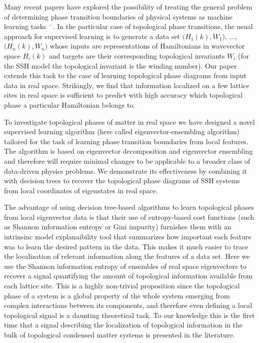 \documentclass[fleqn,10pt]{wlscirep}
\begin{document}
Many recent papers have explored the possibility of treating the general problem of determining phase transition boundaries of physical systems as machine learning tasks \cite{carrasquilla2017machine}$^-$\cite{rodriguez2018identifying}. In the particular case of topological phase transitions, the usual approach for supervised learning is to generate a data set $\big(H_1(k), W_1\big)$, ..., $\big(H_n(k), W_n\big)$ whose inputs are representations of Hamiltonians in wavevector space $H_i(k)$ and targets are their corresponding topological invariants $W_i$ (for the SSH model the topological invariant is the winding number). Our paper extends this task to the case of learning topological phase diagrams from input data in real space. Strikingly, we find that information localized on a few lattice sites in real space is sufficient to predict with high accuracy which topological phase a particular Hamiltonian belongs to.

To investigate topological phases of matter in real space we have designed a novel supervised learning algorithm (here called eigenvector-ensembling algorithm) tailored for the task of learning phase transition boundaries from local features. The algorithm is based on eigenvector decomposition and eigenvector ensembling and therefore will require minimal changes to be applicable to a broader class of data-driven physics problems. We demonstrate its effectiveness by combining it with decision trees to recover the topological phase diagrams of SSH systems from local coordinates of eigenstates in real space.

The advantage of using decision tree-based algorithms to learn topological phases from local eigenvector data is that their use of entropy-based cost functions (such as Shannon information entropy or Gini impurity) furnishes them with an intrinsinc model explanaibility tool that summarizes how important each feature was to learn the desired pattern in the data. This makes it much easier to trace the localization of relevant information along the features of a data set. Here we use the Shannon information entropy of ensembles of real space eigenvectors to recover a signal quantifying the amount of topological information available from each lattice site. This is a highly non-trivial proposition since the topological phase of a system is a global property of the whole system emerging from complex interactions between its components, and therefore even defining a local topological signal is a daunting theoretical task. To our knowledge this is the first time that a signal describing the localization of topological information in the bulk of topological condensed matter systems is presented in the literature.
\end{document}
